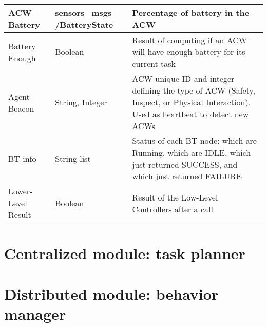 \begin{table}[htb]
\begin{tabular}{|p{}|p{}|p{}|}
      \gls{ACW} Battery & sensors\_msgs /BatteryState & Percentage of battery in the \gls{ACW}\\ \hline
      
      Battery Enough & Boolean & Result of computing if an \gls{ACW} will have enough battery for its current task \\ \hline
      
      Agent Beacon & String, Integer & \gls{ACW} unique ID and integer defining the type of \gls{ACW} (Safety, Inspect, or Physical Interaction). Used as heartbeat to detect new \glspl{ACW} \\ \hline
      
      \gls{BT} info & String list & Status of each \gls{BT} node: which are Running, which are IDLE, which just returned SUCCESS, and which just returned FAILURE \\ \hline
      
      Lower-Level Result & Boolean & Result of the Low-Level Controllers after a call \\ \hline
      
    \end{tabular}
\end{table}

\section{Centralized module: task planner}
\label{sec:Centralized module:TaskPlanner}


\section{Distributed module: behavior manager}
\label{sec:Distributed module: behavior manager}

